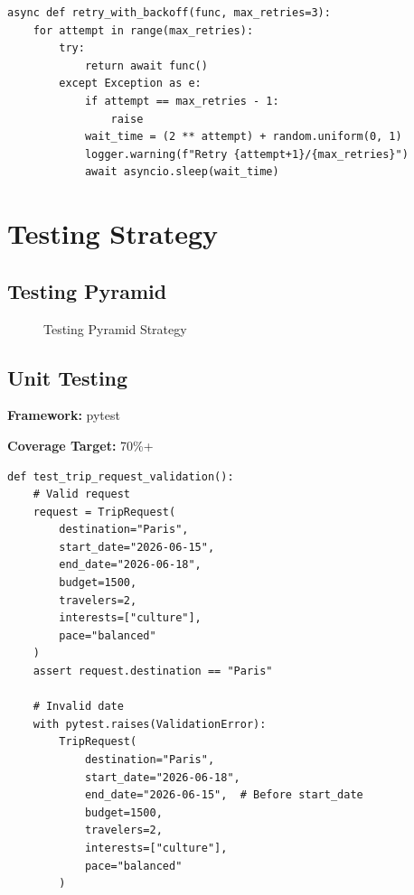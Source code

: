 \documentclass[12pt,a4paper]{report}
\begin{document}
\begin{lstlisting}[style=pythonstyle, caption={Exponential Backoff Retry}]
async def retry_with_backoff(func, max_retries=3):
    for attempt in range(max_retries):
        try:
            return await func()
        except Exception as e:
            if attempt == max_retries - 1:
                raise
            wait_time = (2 ** attempt) + random.uniform(0, 1)
            logger.warning(f"Retry {attempt+1}/{max_retries}")
            await asyncio.sleep(wait_time)
\end{lstlisting}

\chapter{Testing Strategy}

\section{Testing Pyramid}

\begin{figure}[H]
    \centering
    \caption{Testing Pyramid Strategy}
    \label{fig:test-pyramid}
\end{figure}

\section{Unit Testing}

\textbf{Framework:} pytest

\textbf{Coverage Target:} 70\%+

\begin{lstlisting}[style=pythonstyle, caption={Unit Test Example}]
def test_trip_request_validation():
    # Valid request
    request = TripRequest(
        destination="Paris",
        start_date="2026-06-15",
        end_date="2026-06-18",
        budget=1500,
        travelers=2,
        interests=["culture"],
        pace="balanced"
    )
    assert request.destination == "Paris"
    
    # Invalid date
    with pytest.raises(ValidationError):
        TripRequest(
            destination="Paris",
            start_date="2026-06-18",
            end_date="2026-06-15",  # Before start_date
            budget=1500,
            travelers=2,
            interests=["culture"],
            pace="balanced"
        )
\end{lstlisting}
\end{document}
